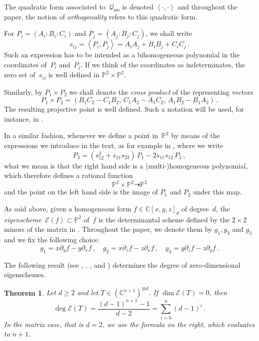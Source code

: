 \documentclass[a4paper, 11pt, reqno]{amsart}
\theoremstyle{plain}
\newtheorem{theorem}[lemma]{Theorem}
\theoremstyle{definition}
\newcommand{\C}{\mathbb{C}}
\newcommand{\p}{\mathbb{P}}
\newcommand{\iso}{\mathcal{Q}_{\mathrm{iso}}}
\newcommand{\Eig}[1]{\mathcal{E}\!\left( {#1} \right)}
\newcommand{\scl}[2]{\left\langle {#1}, {#2} \right\rangle}
\begin{document}
The quadratic form associated to~$\iso$ is denoted $\left\langle \cdot, \cdot \right\rangle$ and throughout the paper, the notion of \emph{orthogonality} refers to this quadratic form.

For $P_i=(A_i:B_i:C_i)$ and $P_j=(A_j:B_j:C_j)$, we shall write
%
\[
  s_{ij} = \scl{P_i}{P_j} = A_i A_j + B_i B_j + C_i C_j \,.
\]
%
Such an expression has to be intended as a bihomogeneous polynomial in the coordinates of~$P_i$ and~$P_j$. If we think of the coordinates as indeterminates, the zero set of~$s_{ij}$ is well defined in $\p^2 \times \p^2$.

Similarly, by $P_1 \times P_2$ we shall denote the \emph{cross product} of the representing vectors
%
\begin{equation}
\label{eq:cross_product}
  P_1 \times P_2 =
  (B_1 C_2 - C_1 B_2, \, C_1 A_2 - A_1 C_2, \, A_1 B_2 - B_1 A_2) \,.
\end{equation}
%
The resulting projective point is well defined. Such a notation will be used, for instance, in .

In a similar fashion, whenever we define a point in~$\p^2$ by means of the expressions we introduce in the text, as for example in , where we write
%
\[
  P_3 = (s_{12}^2+s_{11}s_{22}) \, P_1 - 2s_{11}s_{12} \, P_2 \,,
\]
%
what we mean is that the right hand side is a (multi-)homogeneous polynomial, which therefore defines a rational function
%
\[
  \p^2 \times \p^2 \dashrightarrow \p^2
\]
%
and the point on the left hand side is the image of $P_1$ and $P_2$ under this map.

As said above, given a homogeneous form $f \in \C[x,y,z]_d$ of degree~$d$, the \emph{eigenscheme}~$\Eig{f} \subset \p^2$ of~$f$ is the determinantal scheme defined by the $2 \times 2$ minors of the matrix in .
Throughout the paper, we denote them by $g_1, g_2$ and $g_3$ and we fix the following choice:
%
\begin{equation}
\label{eq:def_minors}
 g_1 = x \partial_y f - y \partial_x f \,, \quad
 g_2 = x \partial_z f - z \partial_x f \,, \quad
 g_3 = y \partial_z f - z \partial_y f \,.
\end{equation}
%

The following result (see \cite[Theorem 2.1]{CartSturm}, \cite{ASS}, \cite{OO}, and \cite[Equation~5.2]{Abo}) determines the degree of zero-dimensional eigenschemes.

\begin{theorem}
\label{theorem:nonempty}
Let $d \ge 2$ and let $T \in (\C^{n+1})^{\otimes d}$.
If $\dim \Eig{T}=0$, then
%
\[
  \deg \Eig{T} =
  \frac{(d-1)^{n+1}-1}{d-2} =
  \sum_{i=0}^{n} (d-1)^i \,.
\]
%
In the matrix case, that is $d = 2$, we use the formula on the right, which evaluates to $n+1$.
\end{theorem}
\end{document}
